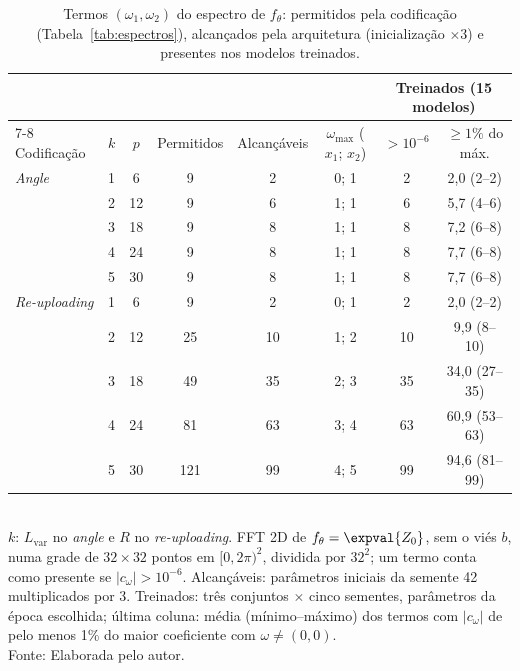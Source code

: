 \begin{table}[htb]
\centering
\footnotesize
\setlength{\tabcolsep}{4pt}
\caption[Frequências permitidas, alcançáveis e usadas]{Termos $(\omega_1, \omega_2)$ do espectro de $f_\theta$: permitidos pela codificação (Tabela~\ref{tab:espectros}), alcançados pela arquitetura (inicialização $\times 3$) e presentes nos modelos treinados.}
\label{tab:espectro-2d}
\begin{tabular}{lccccccc}
\toprule
 & & & & & & \multicolumn{2}{c}{Treinados (15 modelos)} \\
\cmidrule(lr){7-8}
Codificação & $k$ & $p$ & Permitidos & Alcançáveis & $\omega_{\max}$ ($x_1$; $x_2$) & $> 10^{-6}$ & $\geq 1\%$ do máx. \\
\midrule
\textit{Angle} & 1 & 6 & 9 & 2 & 0; 1 & 2 & 2,0 (2--2) \\
 & 2 & 12 & 9 & 6 & 1; 1 & 6 & 5,7 (4--6) \\
 & 3 & 18 & 9 & 8 & 1; 1 & 8 & 7,2 (6--8) \\
 & 4 & 24 & 9 & 8 & 1; 1 & 8 & 7,7 (6--8) \\
 & 5 & 30 & 9 & 8 & 1; 1 & 8 & 7,7 (6--8) \\
\midrule
\textit{Re-uploading} & 1 & 6 & 9 & 2 & 0; 1 & 2 & 2,0 (2--2) \\
 & 2 & 12 & 25 & 10 & 1; 2 & 10 & 9,9 (8--10) \\
 & 3 & 18 & 49 & 35 & 2; 3 & 35 & 34,0 (27--35) \\
 & 4 & 24 & 81 & 63 & 3; 4 & 63 & 60,9 (53--63) \\
 & 5 & 30 & 121 & 99 & 4; 5 & 99 & 94,6 (81--99) \\
\bottomrule
\end{tabular}
\\[2pt]
{\footnotesize $k$: $L_\text{var}$ no \textit{angle} e $R$ no \textit{re-uploading}. FFT 2D de $f_\theta = \expval{Z_0}$, sem o viés $b$, numa grade de $32 \times 32$ pontos em $[0, 2\pi)^2$, dividida por $32^2$; um termo conta como presente se $|c_\omega| > 10^{-6}$. Alcançáveis: parâmetros iniciais da semente 42 multiplicados por 3. Treinados: três conjuntos $\times$ cinco sementes, parâmetros da época escolhida; última coluna: média (mínimo--máximo) dos termos com $|c_\omega|$ de pelo menos 1\% do maior coeficiente com $\omega \neq (0, 0)$.}
\\[2pt]
{\footnotesize Fonte: Elaborada pelo autor.}
\end{table}
